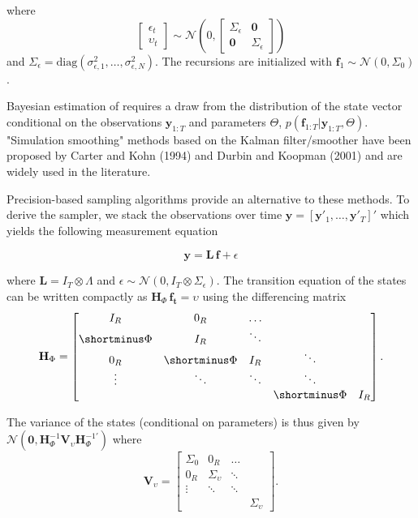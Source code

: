 \documentclass[notitlepage,a4paper,12pt]{article}
\begin{document}
where 
$$
\begin{bmatrix}
    \epsilon_t \\
    \upsilon_t
\end{bmatrix}
\sim \mathcal{N}(0,
\begin{bmatrix}
\Sigma_{\epsilon} & \mathbf{0} \\
\mathbf{0} & \Sigma_{\epsilon}
\end{bmatrix}
)
$$
and $\Sigma_{\epsilon} = \text{diag}(\sigma^2_{\epsilon, 1}, \dots, \sigma^2_{\epsilon, N})$. The recursions are initialized with $\mathbf{f}_1 \sim \mathcal{N}(0, \Sigma_0)$.

Bayesian estimation of  requires a draw from the distribution of the state vector conditional on the observations $\mathbf{y}_{1:T}$ and parameters $\Theta$, $p(\mathbf{f}_{1:T}|\mathbf{y}_{1:T}, \Theta)$. "Simulation smoothing" methods based on the Kalman filter/smoother have been proposed by Carter and Kohn (1994) and Durbin and Koopman (2001) and are widely used in the literature.

Precision-based sampling algorithms \citep{chanjeliazkov_2009} provide an alternative to these methods. To derive the sampler, we stack the observations over time $\mathbf{y} = [\mathbf{y}'_1, \dots, \mathbf{y}'_T]'$ which yields the following measurement equation

\begin{equation}
\mathbf{y} = \mathbf{L} \, \mathbf{f} + \epsilon
\end{equation} 

where $ \mathbf{L} = I_T \otimes \Lambda$ and $\epsilon \sim \mathcal{N}(0, I_T \otimes \Sigma_{\epsilon})$. The transition equation of the states can be written compactly as $\mathbf{H}_{\Phi} \, \mathbf{f_t} = \upsilon$ using the differencing matrix 
$$
\mathbf{H}_{\Phi}
=
\begin{bmatrix}
    I_R & 0_R & \dots \\
    \shortminus\Phi & I_R & \ddots \\
    0_R & \shortminus\Phi & I_R & \ddots \\
    \vdots & \ddots & \ddots & \ddots \\
    & & & \shortminus\Phi & I_R
\end{bmatrix}.
$$

The variance of the states (conditional on parameters) is thus given by $\mathcal{N}(\mathbf{0},\mathbf{H}^{-1}_{\Phi} \mathbf{V}_{\upsilon} \mathbf{H}^{-1'}_{\Phi})$ where 
$$
\mathbf{V}_{\upsilon} = 
\begin{bmatrix}
    \Sigma_{0} & 0_R & \dots \\
    0_R & \Sigma_{\upsilon} & \ddots \\
    \vdots & \ddots & \ddots \\
    & & & \Sigma_{\upsilon} 
\end{bmatrix}
.
$$
\end{document}
